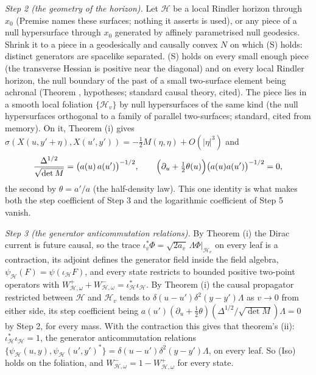 \emph{Step 2 (the geometry of the horizon).} Let $\mathcal{H}$ be a local Rindler horizon through $x_{0}$ (Premise  names these surfaces; nothing it asserts is used), or any piece of a null hypersurface through $x_{0}$ generated by affinely parametrised null geodesics. Shrink it to a piece in a geodesically and causally convex $N$ on which (S) holds: distinct generators are spacelike separated. (S) holds on every small enough piece (the transverse Hessian is positive near the diagonal) and on every local Rindler horizon, the null boundary of the past of a small two-surface element being achronal (Theorem , hypotheses; standard causal theory, cited). The piece lies in a smooth local foliation $\{\mathcal{H}_{v}\}$ by null hypersurfaces of the same kind (the null hypersurfaces orthogonal to a family of parallel two-surfaces; standard, cited from memory). On it, Theorem (i) gives $\sigma(X(u, y' + \eta), X(u', y')) = -\tfrac12 M(\eta, \eta) + O(|\eta|^{3})$ and
\[
\frac{\Delta^{1/2}}{\sqrt{\det M}} = \bigl(a(u)\,a(u')\bigr)^{-1/2},\qquad \Bigl(\partial_{u} + \tfrac12\theta(u)\Bigr)\bigl(a(u)a(u')\bigr)^{-1/2} = 0,
\]
the second by $\theta = a'/a$ (the half-density law). This one identity is what makes both the step coefficient of Step 3 and the logarithmic coefficient of Step 5 vanish.

\emph{Step 3 (the generator anticommutation relations).} By Theorem (i) the Dirac current is future causal, so the trace $\iota_{v}^{*}\Phi = \sqrt{2a_{v}}\,\Lambda\Phi|_{\mathcal{H}_{v}}$ on every leaf is a contraction, its adjoint defines the generator field inside the field algebra, $\psi_{\mathcal{H}}(F) = \psi(\iota_{\mathcal{H}}F)$, and every state restricts to bounded positive two-point operators with $W^{+}_{\mathcal{H},\omega} + W^{-}_{\mathcal{H},\omega} = \iota_{\mathcal{H}}^{*}\iota_{\mathcal{H}}$. By Theorem (i) the causal propagator restricted between $\mathcal{H}$ and $\mathcal{H}_{v}$ tends to $\delta(u - u')\delta^{2}(y - y')\Lambda$ as $v \to 0$ from either side, its step coefficient being $a(u')(\partial_{u} + \tfrac12\theta)(\Delta^{1/2}/\sqrt{\det M})\Lambda = 0$ by Step 2, for every mass. With the contraction this gives that theorem's (ii): $\iota_{\mathcal{H}}^{*}\iota_{\mathcal{H}} = 1$, the generator anticommutation relations $\{\psi_{\mathcal{H}}(u, y), \psi_{\mathcal{H}}(u', y')^{*}\} = \delta(u - u')\delta^{2}(y - y')\Lambda$, on every leaf. So (Iso) holds on the foliation, and $W^{-}_{\mathcal{H},\omega} = 1 - W^{+}_{\mathcal{H},\omega}$ for every state.

